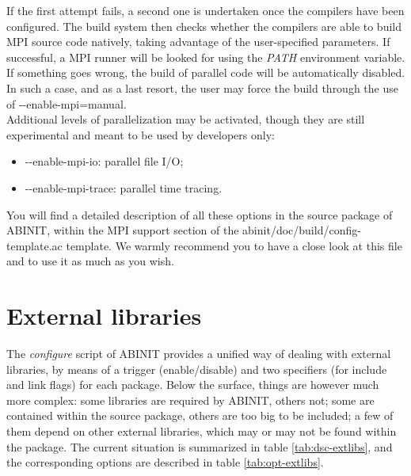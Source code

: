 If the first attempt fails, a second one is undertaken once the compilers
have been configured. The build system then checks whether the compilers
are able to build MPI source code natively, taking advantage of the
user-specified parameters. If successful, a MPI runner will be looked
for using the \textit{PATH} environment variable. If something goes
wrong, the build of parallel code will be automatically disabled.
In such a case, and as a last resort, the user may force the build
through the use of \textquotedbl{}-{-}enable-mpi=manual\textquotedbl{}.
\\


Additional levels of parallelization may be activated, though they
are still experimental and meant to be used by developers only: 
\begin{itemize}
\item \textquotedbl{}-{-}enable-mpi-io\textquotedbl{}: parallel file I/O; 
\item \textquotedbl{}-{-}enable-mpi-trace\textquotedbl{}: parallel time
tracing. 
\end{itemize}
You will find a detailed description of all these options in the source
package of ABINIT, within the MPI support section of the \textquotedbl{}{~}abinit/doc/build/config-template.ac\textquotedbl{}
template. We warmly recommend you to have a close look at this file
and to use it as much as you wish.


\section{External libraries}

The \textit{configure} script of ABINIT provides a unified way of
dealing with external libraries, by means of a trigger (enable/disable)
and two specifiers (for include and link flags) for each package.
Below the surface, things are however much more complex: some libraries
are required by ABINIT, others not; some are contained within the
source package, others are too big to be included; a few of them depend
on other external libraries, which may or may not be found within
the package. The current situation is summarized in table \ref{tab:dsc-extlibs},
and the corresponding options are described in table \ref{tab:opt-extlibs}.
\\


